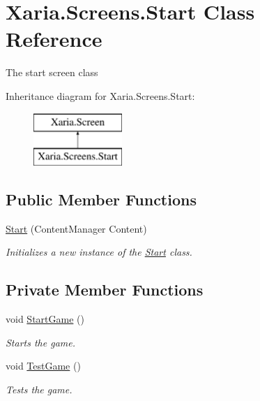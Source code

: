 \hypertarget{classXaria_1_1Screens_1_1Start}{}\section{Xaria.\+Screens.\+Start Class Reference}
\label{classXaria_1_1Screens_1_1Start}


The start screen class  


Inheritance diagram for Xaria.\+Screens.\+Start\+:\begin{figure}[H]
\begin{center}
\leavevmode
\includegraphics[height=2.000000cm]{classXaria_1_1Screens_1_1Start}
\end{center}
\end{figure}
\subsection*{Public Member Functions}
\begin{DoxyCompactItemize}
\item 
\hyperlink{classXaria_1_1Screens_1_1Start_ada7d2e5e90ae995a6a11cd040e383e79}{Start} (Content\+Manager Content)
\begin{DoxyCompactList}\small\item\em Initializes a new instance of the \hyperlink{classXaria_1_1Screens_1_1Start}{Start} class. \end{DoxyCompactList}\end{DoxyCompactItemize}
\subsection*{Private Member Functions}
\begin{DoxyCompactItemize}
\item 
void \hyperlink{classXaria_1_1Screens_1_1Start_a4d1d092a06279487dc869e87c9442a11}{Start\+Game} ()
\begin{DoxyCompactList}\small\item\em Starts the game. \end{DoxyCompactList}\item 
void \hyperlink{classXaria_1_1Screens_1_1Start_ae94182dbd1a9186a589364962c718418}{Test\+Game} ()
\begin{DoxyCompactList}\small\item\em Tests the game. \end{DoxyCompactList}\end{DoxyCompactItemize}
